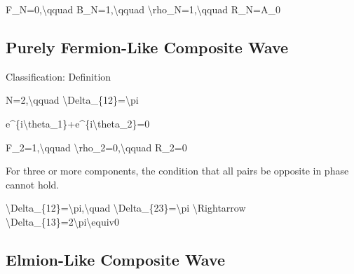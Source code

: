 \documentclass[
  a4paper,
]{article}
\newenvironment{Shaded}{}{}
\newcommand{\NormalTok}[1]{#1}
\begin{document}
\begin{Shaded}
\begin{Highlighting}[]
\NormalTok{F\_N=0,\textbackslash{}qquad B\_N=1,\textbackslash{}qquad \textbackslash{}rho\_N=1,\textbackslash{}qquad R\_N=A\_0}
\end{Highlighting}
\end{Shaded}

\subsection{Purely Fermion-Like Composite
Wave}\label{purely-fermion-like-composite-wave}

Classification: Definition

\begin{Shaded}
\begin{Highlighting}[]
\NormalTok{N=2,\textbackslash{}qquad \textbackslash{}Delta\_\{12\}=\textbackslash{}pi}
\end{Highlighting}
\end{Shaded}

\begin{Shaded}
\begin{Highlighting}[]
\NormalTok{e\^{}\{i\textbackslash{}theta\_1\}+e\^{}\{i\textbackslash{}theta\_2\}=0}
\end{Highlighting}
\end{Shaded}

\begin{Shaded}
\begin{Highlighting}[]
\NormalTok{F\_2=1,\textbackslash{}qquad \textbackslash{}rho\_2=0,\textbackslash{}qquad R\_2=0}
\end{Highlighting}
\end{Shaded}

For three or more components, the condition that all pairs be opposite
in phase cannot hold.

\begin{Shaded}
\begin{Highlighting}[]
\NormalTok{\textbackslash{}Delta\_\{12\}=\textbackslash{}pi,\textbackslash{}quad \textbackslash{}Delta\_\{23\}=\textbackslash{}pi}
\NormalTok{\textbackslash{}Rightarrow}
\NormalTok{\textbackslash{}Delta\_\{13\}=2\textbackslash{}pi\textbackslash{}equiv0}
\end{Highlighting}
\end{Shaded}

\subsection{Elmion-Like Composite
Wave}\label{elmion-like-composite-wave}
\end{document}
